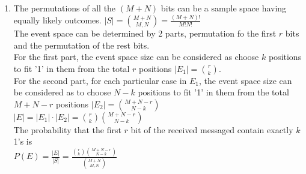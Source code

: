 \documentclass{article}
\begin{document}
\begin{enumerate}
\begin{enumerate}
	\end{enumerate}
	\item
	\begin{enumerate}
		\mysolu
		The permutations of all the $(M+N)$ bits can be a sample space having equally likely outcomes.
		${|S|={M+N \choose M,N}=\frac{(M+N)!}{M!N!}}$\\
		The event space can be determined by 2 parts, permutation fo the first ${r}$ bits and the permutation of the rest bits.\\
		For the first part, the event space size can be considered as choose ${k}$ positions to fit '1' in them from the total ${r}$ positions ${|E_1|={r \choose k}}$.\\
		For the second part, for each particular case in ${E_1}$, the event space size can be considered as to choose ${N-k}$ positions to fit '1' in them from the total ${M+N-r}$ positions ${|E_2|={M+N-r \choose N-k}}$\\
		${|E|= |E_1|\cdot |E_2| ={r \choose k}{M+N-r \choose N-k} }$\\	
		\myansw
		The probability that the first ${r}$ bit of the received messaged contain exactly ${k}$ 1's is\\
		${P(E)=\frac{|E|}{|S|}=\frac{{r \choose k}{M+N-r \choose N-k}}{{M+N \choose M,N}}}$\\
		

\end{enumerate}
\end{enumerate}
\end{document}
